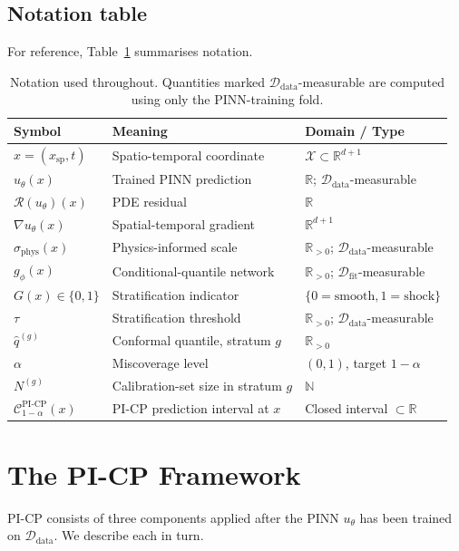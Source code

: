 \documentclass[11pt]{article}
\theoremstyle{definition}
\theoremstyle{remark}
\newcommand{\R}{\mathbb{R}}
\newcommand{\Ddata}{\mathcal{D}_{\text{data}}}
\newcommand{\Dfit}{\mathcal{D}_{\text{fit}}}
\newcommand{\sphys}{\sigma_{\mathrm{phys}}}
\newcommand{\PICP}{\mathrm{PI\text{-}CP}}
\newcommand{\Rop}{\mathcal{R}}
\begin{document}
\subsection{Notation table}

For reference, Table~\ref{tab:notation} summarises notation.

\begin{table}[h]
\centering
\caption{Notation used throughout. Quantities marked $\Ddata$-measurable are computed using only the PINN-training fold.}
\label{tab:notation}
\small
\begin{tabular}{lll}
\toprule
Symbol & Meaning & Domain / Type \\
\midrule
$x = (x_{\text{sp}}, t)$ & Spatio-temporal coordinate & $\mathcal{X} \subset \R^{d+1}$ \\
$u_\theta(x)$ & Trained PINN prediction & $\R$; $\Ddata$-measurable \\
$\Rop(u_\theta)(x)$ & PDE residual & $\R$ \\
$\nabla u_\theta(x)$ & Spatial-temporal gradient & $\R^{d+1}$ \\
$\sphys(x)$ & Physics-informed scale & $\R_{>0}$; $\Ddata$-measurable \\
$g_\phi(x)$ & Conditional-quantile network & $\R_{>0}$; $\Dfit$-measurable \\
$G(x) \in \{0,1\}$ & Stratification indicator & $\{0=\text{smooth}, 1=\text{shock}\}$ \\
$\tau$ & Stratification threshold & $\R_{>0}$; $\Ddata$-measurable \\
$\hat{q}^{(g)}$ & Conformal quantile, stratum $g$ & $\R_{>0}$ \\
$\alpha$ & Miscoverage level & $(0,1)$, target $1{-}\alpha$ \\
$N^{(g)}$ & Calibration-set size in stratum $g$ & $\mathbb{N}$ \\
$\mathcal{C}^{\PICP}_{1-\alpha}(x)$ & PI-CP prediction interval at $x$ & Closed interval $\subset \R$ \\
\bottomrule
\end{tabular}
\end{table}

\section{The PI-CP Framework}
\label{sec:method}

PI-CP consists of three components applied after the PINN $u_\theta$ has been trained on $\Ddata$. We describe each in turn.
\end{document}
